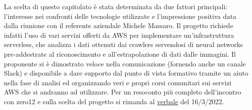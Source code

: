 La scelta di questo capitolato è stata determinata da due fattori principali: l'interesse nei confronti delle tecnologie utilizzate e l'impressione positiva data dalla riunione con il referente aziendale Michele Massaro.
Il progetto richiede infatti l'uso di vari servizi offerti da AWS per implementare un'infrastruttura serverless, che analizza i dati ottenuti dai crawlers servendosi di neural networks pre-addestrate al riconoscimento e all'estrapolazione di dati dalle immagini. \newline
Il proponente si è dimostrato veloce nella comunicazione (fornendo anche un canale Slack) e disponibile a dare supporto dal punto di vista formativo tramite un aiuto nella fase di analisi ed organizzando veri e propri corsi comunitari sui servizi AWS che si andranno ad utilizzare.
Per un resoconto più completo dell'incontro con zero12 e sulla scelta del progetto si rimanda al \href{https://github.com/Bug-s-Bunny-Team/docs/blob/master/docs/Verbali/Esterni/ve_20220316.pdf}{verbale} del 16/3/2022.
